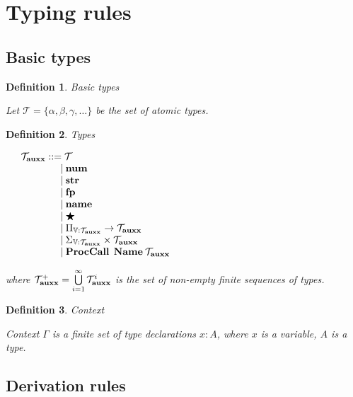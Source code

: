 \documentclass[a4paper]{article}
\newtheorem{defin}{Definition}
\begin{document}
\section{Typing rules}

\subsection{Basic types}

\begin{defin} Basic types

Let $\mathcal{T} = \{ \alpha, \beta, \gamma, \dots \}$ be the set of atomic types.

\end{defin}

\begin{defin} Types

$\begin{array}{lll}
&\mathcal{T}_{\bf auxx} ::= \mathcal{T}&\\
&\quad\quad\quad\quad | \: {\bf num} &\\
&\quad\quad\quad\quad | \: {\bf str} &\\
&\quad\quad\quad\quad | \: {\bf fp} &\\
&\quad\quad\quad\quad | \: {\bf name} &\\
&\quad\quad\quad\quad | \: \bigstar &\\
&\quad\quad\quad\quad | \: \Pi_{\mathbb{V} : \mathcal{T}_{\bf auxx}} \to \mathcal{T}_{\bf auxx}& \\
&\quad\quad\quad\quad | \: \Sigma_{\mathbb{V} : \mathcal{T}_{\bf auxx}} \times \mathcal{T}_{\bf auxx}& \\
&\quad\quad\quad\quad | \: {\bf ProcCall \:} \: {\bf Name} \: \mathcal{T}_{\bf auxx}&
\end{array}$

where $\mathcal{T}_{\bf auxx}^{+} = \bigcup \limits_{i = 1}^{\infty} \mathcal{T}_{\bf auxx}^i$ is the set of non-empty finite sequences of types.
\end{defin}

\begin{defin} Context

  Context $\Gamma$ is a finite set of type declarations $x : A$, where $x$ is a variable, $A$ is a type.

\end{defin}

\subsection{Derivation rules}
\end{document}
